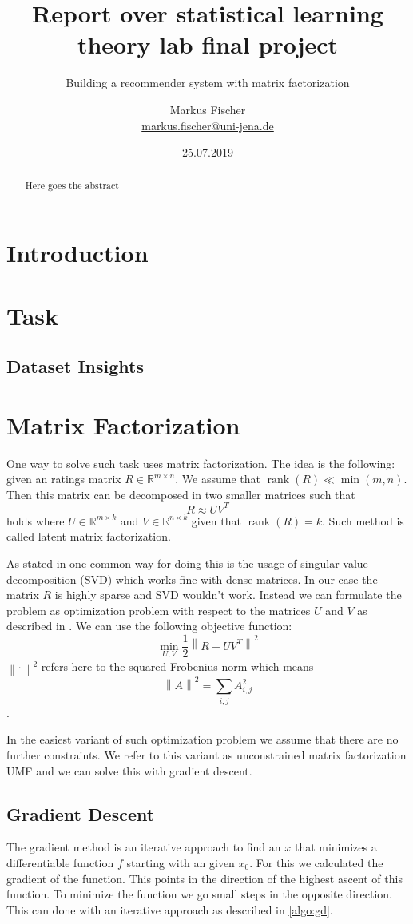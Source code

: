 \documentclass[DIV=14,twocolumn]{scrartcl}
\title{Report over statistical learning theory lab final project}
\subtitle{Building a recommender system with matrix factorization}
\author{Markus Fischer\\ \small{\href{mailto:markus.fischer@uni-jena.de}{markus.fischer@uni-jena.de}}}
\date{25.07.2019}
\DeclareMathOperator{\rank}{rank}
\newcommand{\norm}[1]{\left\lVert#1\right\rVert}
\begin{document}
\maketitle
\begin{abstract}
Here goes the abstract
\end{abstract}

\section{Introduction}
\section{Task}
\subsection{Dataset Insights}

\section{Matrix Factorization}
One way to solve such task uses matrix factorization. The idea is the following: given an ratings matrix $R\in\mathbb{R}^{m\times n}$. We assume that $\rank(R)\ll\min(m,n)$. Then this matrix can be decomposed in two smaller matrices such that 
$$R\approx UV^T$$ holds where $U\in\mathbb{R}^{m\times k}$ and $V\in\mathbb{R}^{n\times k}$ given that $\rank(R)=k$. Such method is called latent matrix factorization.

As stated in \cite{KoBeVo09} one common way for doing this is the usage of singular value decomposition (SVD) which works fine with dense matrices. In our case the matrix $R$ is highly sparse and SVD wouldn't work. Instead we can formulate the problem as optimization problem with respect to the matrices $U$ and $V$ as described in \cite{Ag16}. We can use the following objective function: 
$$\min_{U,V} \frac{1}{2}\norm{R-UV^T}^2$$ 
$\norm{\cdot}^2$ refers here to the squared Frobenius norm which means $$\norm{A}^2=\sum_{i,j}A_{i,j}^2$$.

In the easiest variant of such optimization problem we assume that there are no further constraints. We refer to this variant as unconstrained matrix factorization UMF and we can solve this with gradient descent.

\subsection{Gradient Descent}
The gradient method is an iterative approach to find an $x$ that minimizes a differentiable function $f$ starting with an given $x_0$. For this we calculated the gradient of the function. This points in the direction of the highest ascent of this function. To minimize the function we go small steps in the opposite direction. This can done with an iterative approach as described in \ref{algo:gd}. 
\end{document}
